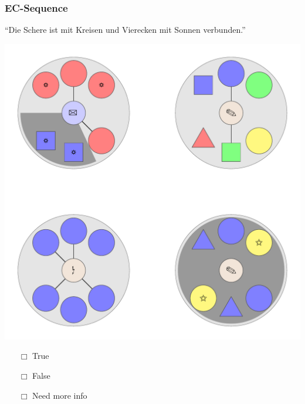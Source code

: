 \documentclass[fleqn,10pt,serif,xcolor=dvipsnames]{beamer}
\newcommand{\EC}{EC\xspace}
\newcommand{\mymark}[1]{{\color{blue}{#1}}}
\begin{document}
\begin{frame}
  \frametitle{\EC-Sequence}
  \begin{center}
    ``Die Schere ist mit Kreisen und Vierecken mit Sonnen verbunden.''

    \vspace{0.1cm}

    \includegraphics[width=0.5 \textwidth]{../../pictures/ec_01_4.pdf}

    \vspace{0.1cm}

    \begin{multicols}{3}
      \begin{itemize} 
      \item[$\Box$] True\\
        \onslide<2>{$\leadsto$  \mymark{false}}
      \item[$\Box$] False\\
        \onslide<2>{$\leadsto$ \mymark{false}}
      \item[$\Box$] Need more info 
      \end{itemize}
    \end{multicols}

  \end{center}
\end{frame}
\end{document}
